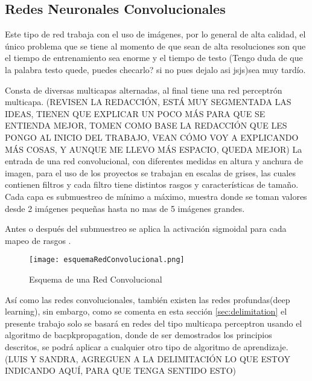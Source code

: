         \subsection{Redes Neuronales Convolucionales}

            Este tipo de red trabaja con el uso de imágenes, por lo general de alta calidad, el \'unico problema que se tiene 
            al momento de que sean de alta resoluciones son que el tiempo de entrenamiento sea enorme y el tiempo de testo (Tengo duda de que la palabra testo quede, puedes checarlo? si no pues dejalo asi jsjs)sea muy tardío.

            Consta de diversas multicapas alternadas, al final tiene una red perceptr\'on multicapa. (REVISEN LA REDACCIÓN, ESTÁ MUY SEGMENTADA LAS IDEAS, TIENEN QUE EXPLICAR UN POCO MÁS PARA QUE SE ENTIENDA MEJOR, TOMEN COMO BASE LA REDACCIÓN QUE LES PONGO AL INICIO DEL TRABAJO, VEAN CÓMO VOY A EXPLICANDO MÁS COSAS, Y AUNQUE ME LLEVO MÁS ESPACIO, QUEDA MEJOR)
            La entrada de una red convolucional, con diferentes medidas en altura y anchura de imagen, para el uso 
            de los proyectos se trabajan en escalas de grises, las cuales contienen filtros y cada filtro tiene distintos 
            rasgos y características de tamaño. Cada capa es submuestreo de m\'inimo a m\'aximo, muestra donde se toman valores 
            desde 2 im\'agenes pequeñas hasta no mas de 5 im\'agenes grandes.

            Antes o despu\'es del submuestreo se aplica la activaci\'on sigmoidal para cada mapeo de rasgos \cite{duran2017}.

            \begin{figure}[H]
                \centering
                \texttt{[image: esquemaRedConvolucional.png]}
                \caption{Esquema de una Red Convolucional \cite{duran2017}}
                \label{fig:fig7}
            \end{figure}

Así como las redes convolucionales, también existen las redes profundas(deep learning), sin embargo, como se comenta en esta sección \ref{sec:delimitation} el presente trabajo solo se basará en redes del tipo multicapa perceptron usando el algoritmo de bacpkpropagation, donde de ser demostrados los principios descritos, se podrá aplicar a cualquier otro tipo de algoritmo de aprendizaje.  (LUIS Y SANDRA, AGREGUEN A LA DELIMITACIÓN LO QUE ESTOY INDICANDO AQUÍ, PARA QUE TENGA SENTIDO ESTO)



